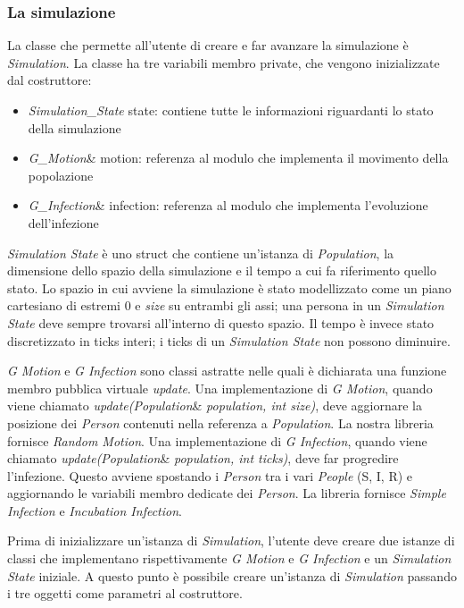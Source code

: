 \documentclass[a4paper,10pt,twocolumn]{article}
\begin{document}
\subsubsection*{La simulazione}
La classe che permette all’utente di creare e far avanzare la simulazione è \emph{Simulation}. La classe ha tre variabili membro private, che vengono inizializzate dal costruttore:
\begin{itemize}
    \item \emph{Simulation\_State} state: contiene tutte le informazioni riguardanti lo stato della simulazione
    \item \emph{G\_Motion}\& motion: referenza al modulo che implementa il movimento della popolazione
    \item \emph{G\_Infection}\& infection: referenza al modulo che implementa l’evoluzione dell’infezione
\end{itemize}

\emph{Simulation State} è uno struct che contiene un’istanza di \emph{Population}, la dimensione dello spazio della simulazione e il tempo a cui fa riferimento quello stato. Lo spazio in cui avviene la simulazione è stato modellizzato come un piano cartesiano di estremi 0 e \emph{size} su entrambi gli assi; una persona in un \emph{Simulation State} deve sempre trovarsi all’interno di questo spazio. Il tempo è invece stato discretizzato in ticks interi; i ticks di un \emph{Simulation State} non possono diminuire.

\emph{G Motion} e \emph{G Infection} sono classi astratte nelle quali è dichiarata una funzione membro pubblica virtuale \emph{update}. Una implementazione di \emph{G Motion}, quando viene chiamato \emph{update(Population}\& \emph{population, int size)}, deve aggiornare la posizione dei \emph{Person} contenuti nella referenza a \emph{Population}. La nostra libreria fornisce \emph{Random Motion}. Una implementazione di \emph{G Infection}, quando viene chiamato \emph{update(Population}\& \emph{population, int ticks)}, deve far progredire l’infezione. Questo avviene spostando i \emph{Person} tra i vari \emph{People} (S, I, R) e aggiornando le variabili membro dedicate dei \emph{Person}. La libreria fornisce \emph{Simple Infection} e \emph{Incubation Infection}.

Prima di inizializzare un’istanza di \emph{Simulation}, l’utente deve creare due istanze di classi che implementano rispettivamente \emph{G Motion} e \emph{G Infection} e un \emph{Simulation State} iniziale. A questo punto è possibile creare un’istanza di \emph{Simulation} passando i tre oggetti come parametri al costruttore.
\end{document}

